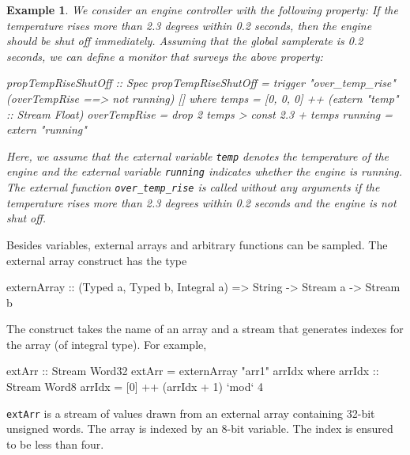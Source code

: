 \documentclass[]{article}
\theoremstyle{example}
\newtheorem{example}{Example}
\begin{document}
\begin{example}
\label{exm:engine}
We consider an engine controller with the following property:
If the temperature rises more than 2.3 degrees within 0.2 seconds, then
the engine should be shut off immediately.
Assuming that the global samplerate is 0.2 seconds, we can define a monitor that
surveys the above property:
%
\begin{code}
propTempRiseShutOff :: Spec
propTempRiseShutOff = trigger "over_temp_rise" (overTempRise ==> not running) []
  where
  temps        = [0, 0, 0] ++ (extern "temp" :: Stream Float)
  overTempRise = drop 2 temps > const 2.3 + temps
  running      = extern "running"

\end{code}
%
Here, we assume that the external variable {\tt temp} denotes the temperature of the
engine and the external variable {\tt running} indicates whether the engine is running.
The external function {\tt over\_temp\_rise} is called without any arguments if the
temperature rises more than 2.3 degrees within 0.2 seconds and the engine is not shut
off.
\end{example}

Besides variables, external arrays and arbitrary functions can be sampled.  The
external array construct has the type
%
\begin{code}
externArray :: (Typed a, Typed b, Integral a) 
            => String -> Stream a -> Stream b  
\end{code}
%
The construct takes the name of an array and a stream that generates indexes for
the array (of integral type).  For example,
%
\begin{code}
extArr :: Stream Word32
extArr = externArray "arr1" arrIdx
  where 
  arrIdx :: Stream Word8
  arrIdx = [0] ++ (arrIdx + 1) `mod` 4
\end{code}
{\tt extArr} is a stream of values drawn from an external array containing
32-bit unsigned words.  The array is indexed by an 8-bit variable.  The index
is ensured to be less than four.
\end{document}
